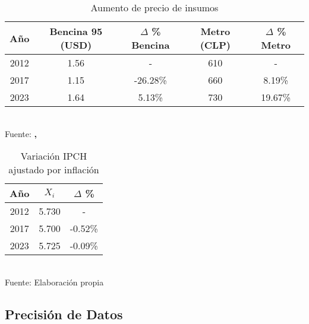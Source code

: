\documentclass[12pt]{article} %
\begin{document}
\begin{table}[H]
    \centering
    \caption{Aumento de precio de insumos}
    \vspace{0.2cm}
    \begin{tabular}{|c|c|c|c|c|}
        \hline
        Año & Bencina 95 (USD) & $\Delta$ \% Bencina & Metro (CLP) & $\Delta$ \% Metro \\
        \hline
        2012 & 1.56 & - & 610 & - \\
        2017 & 1.15 & -26.28\% & 660 & 8.19\% \\
        2023 & 1.64 & 5.13\% & 730 & 19.67\% \\
        \hline
    \end{tabular}
    \label{Insumos}
    \vspace{0.2cm}
    \\Fuente: \textbf{\cite{tradingeconomics}, \cite{bcentral}}
\end{table}

\begin{table}[H]
    \centering
    \caption{Variación IPCH ajustado por inflación}
    \vspace{0.2cm}
    \begin{tabular}{|c|c|c|}
        \hline
        Año & $X_i$ & $\Delta$ \% \\
        \hline
        2012 & 5.730 & - \\
        2017 & 5.700 & -0.52\% \\
        2023 & 5.725 & -0.09\% \\
        \hline
    \end{tabular}
    \vspace{0.2cm}
    \label{VariacionIPCH}
    \\Fuente: Elaboración propia
\end{table}

\subsection{Precisión de Datos} \label{sec:Precision}
\end{document}
